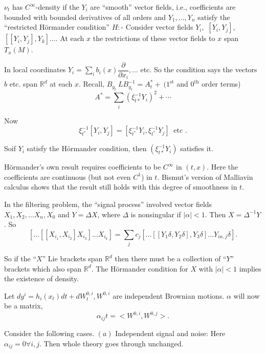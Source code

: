 \begin{theorem}%
 $ \nu_t $  has $ C^\infty $-density if the $Y_i$ 
  are ``smooth'' vector fields,  i.e., 
  coefficients are bounded with bounded derivatives of all orders
  and  $ Y_1, \ldots, Y_n $ satisfy the ``restricted
  H\"ormander  condition''  $ H: $-  Consider  vector  fields 
  $ Y_i,$   $[ Y_i, Y_j]$, $[[ Y_i, Y_j ], Y_k] \ldots$.   At
  each  $x$  the  restrictions of these vector fields to
  $ x $ span $ T_x ( M ) $. 
\end{theorem}

In local coordinates  $ Y_i = \sum \limits_{i}  b_i  (x) \dfrac{
  \partial}{\partial x_i}, \ldots $ etc.  So the condition says the
vectors  $b$ etc. span $\mathbb{R}^d $  at each  $x$. Recall, $
B_{y_{t}}  ~ L B_{y_{t}}^{-1}= A ^*_t  + ~ ( 1^{\text{st}} $   and  $
0^{\text{th}}$ order terms)  
$$
A^* = \sum_{i} ( \xi ^{-1}_{t*} Y_i )^2 + \cdots 
$$

Now
$$
\xi^{-1}_{t^*} [ Y_i, Y_j ] = [\xi^{-1}_{t^*}  Y_i, \xi^{-1}_{t^*} Y_j]
~\text{ etc }. 
$$

So\pageoriginale if $ Y_i $ satisfy the H\"ormander condition, then 
$(\xi^{-1}_{t*}Y_i)$ satisfies it. 

H\"ormander's own result requires coefficients to be  $ C^\infty $ in $
( t,x ) $. Here the coefficients are continuous  (but not even   $
C^1$)  in $t$. Bismut's version  of Malliavin calculus shows that the
result still holds with this degree of smoothness in $t$. 

In the filtering problem, the ``signal process'' involved vector fields
$ X_1, X_2, \ldots X_n, X_0 $ and $ Y = \Delta X $, where $ \Delta $
is nonsingular if  $ \mid \alpha \mid  < 1 $. Then $ X=\Delta^{-1} Y
$. So   
$$
\left[ \ldots[[ X_{i_{1}}, X_{i_{2}}] X_{i_{3}}] \ldots X_{i_{k}}\right]   =
\sum_{j} c_j \left[ \ldots [[ Y_1 \delta, Y_2 \delta],Y_3 \delta]
  \ldots  Y_{i n,j} \delta \right]. 
$$

So if the  ``$X$''  Lie brackets span $ \mathbb{R}^d $  then there must
be a  collection of  ``$Y$''  brackets which also span  $
\mathbb{R}^d $. The  H\"ormander condition for $X$ with $ \mid \alpha
\mid  < 1 $ implies the existence of density. 

\medskip
{}  Let 
$dy^i = h_i ( x_t ) dt + dW^{0,i}_t, W^{0,i} $ are independent Brownian
motions. $ \alpha $  will now be a matrix, 
$$
\alpha_{ij} t = < W^{0,i}, W^{0,j} >.
$$

Consider the  following cases. $ (a) $  Independent signal and  noise:
Here  $ \alpha_{ij} = 0 \forall i,j $. Then whole theory goes through
unchanged.  

